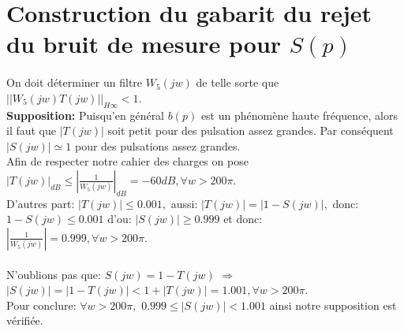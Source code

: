 \documentclass[12pt, a4paper, openany]{report}
\begin{document}
  \begin{center}
    \label{fig9}
  \end{center}  


 \section{Construction du gabarit du rejet du bruit de mesure pour $S(p)$}
 
 \paragraph{}
 On doit déterminer un filtre $W_{5}(jw) $\hspace{1mm} de telle sorte que $||W_{5}(jw)T(jw)||_{H\infty} < 1$.\\
 
  \textbf{Supposition:} \hspace{1mm} Puisqu'en général $b(p)$ \hspace{1mm} est un phénomène haute fréquence, alors il faut que $|T(jw)|$ \hspace{1mm} soit petit pour des pulsation assez grandes. Par conséquent $|S(jw)| \simeq 1$ \hspace{1mm} pour des pulsations assez grandes.\\
  
  Afin de respecter notre cahier des charges on pose $|T(jw)|_{dB} \leqslant |\frac{1}{W_{5}(jw)}|_{dB} = -60 dB, \forall w > 200 \pi. $\\   
  D'autres part: \hspace{1mm} $|T(jw)| \leqslant 0.001, $ \hspace{1mm} aussi: \hspace{1mm} $|T(jw)| = |1-S(jw)|, $\hspace{1mm} donc: \hspace{1mm} $1-S(jw) \leqslant 0.001 $  \hspace{1mm} d'ou: \hspace{1mm} $|S(jw)| \geqslant 0.999$ \hspace{1mm} et donc: $|\frac{1}{W_{5}(jw)}|=0.999, \forall w > 200 \pi.$ \\

\paragraph{}
 N'oublions pas que: $S(jw) = 1-T(jw)$ \hspace{1mm} $\Rightarrow$ $|S(jw)|=|1-T(jw)| < 1+|T(jw)|=1.001, \forall w > 200  \pi .$\\  
 Pour conclure: $\forall w > 200 \pi, $ \hspace{1mm} $ 0.999 \leqslant |S(jw)| < 1.001$ \hspace{1mm} ainsi notre supposition est vérifiée.
 
\end{document}
